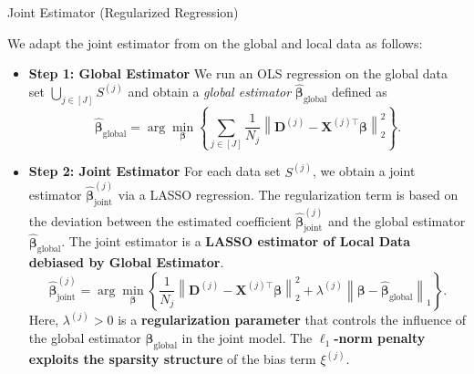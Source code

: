 \documentclass{beamer}
\newcommand{\mb}[1]{{\mathbf{#1}}}
\newcommand{\txrd}[1]{{\textcolor{sintefred}{\textbf{#1}}}}
\begin{document}

\begin{frame}{Joint Estimator (Regularized Regression)}

We adapt the \alert{joint estimator} from \citet{bastani2021predicting} on the global and local data as follows:

\begin{itemize}
    \item \txrd{Step 1: Global Estimator}
    We run an OLS regression on the global data set
    $\bigcup_{j \in [J]} S^{(j)}$
    and obtain a \textit{global estimator}
    $\hat{\bm\beta}_{\text{global}}$ defined as
    \begin{equation}
        \hat{\bm\beta}_{\text{global}}
        =
        \arg\min_{\bm\beta}
        \left\{
        \sum_{j \in [J]}
        \frac{1}{N_j}
        \left\|
            \mb D^{(j)} - \mb X^{(j)\top}\bm\beta
        \right\|_2^2
        \right\}.
        \label{eq:global_estimator}
    \end{equation}

    \item \txrd{Step 2: Joint Estimator}
    For each data set $S^{(j)}$, we obtain a joint estimator
    $\hat{\bm\beta}_{\text{joint}}^{(j)}$
    via a LASSO regression.
    The regularization term is based on the deviation between
    the estimated coefficient
    $\hat{\bm\beta}_{\text{joint}}^{(j)}$
    and the global estimator
    $\hat{\bm\beta}_{\text{global}}$. The joint estimator is a \txrd{LASSO estimator of Local Data debiased by Global Estimator}.
    \begin{equation}
        \hat{\bm\beta}_{\text{joint}}^{(j)}
        =
        \arg\min_{\bm\beta}
        \left\{
        \frac{1}{N_j}
        \left\|
            \mb D^{(j)} - \mb X^{(j)\top}\bm\beta
        \right\|_2^2
        +
        \lambda^{(j)}
        \left\|
            \bm\beta - \hat{\bm\beta}_{\text{global}}
        \right\|_1
        \right\}.
        \label{eq:joint_estimator}
    \end{equation}
    Here, $\lambda^{(j)} > 0$ is a \txrd{regularization parameter} that controls
    the influence of the global estimator
    $\hat{\bm\beta}_{\text{global}}$
    in the joint model.
    The \txrd{$\ell_1$-norm penalty exploits the sparsity structure} of the bias term
    $\xi^{(j)}$.
\end{itemize}

\end{frame}
\end{document}
